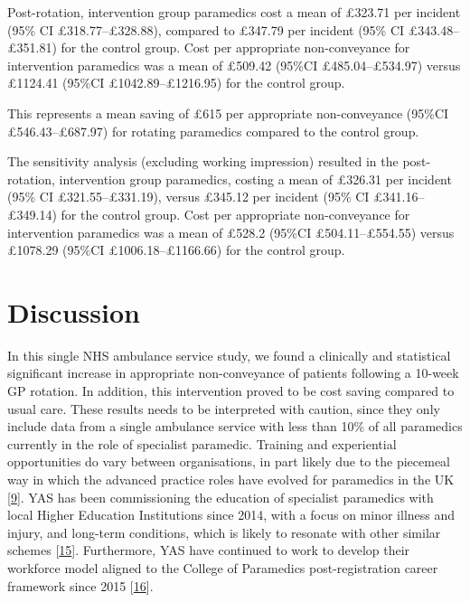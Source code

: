 \documentclass[
  a4paper,
  openany]{article}
\begin{document}
Post-rotation, intervention group paramedics cost a mean of £323.71 per incident (95\% CI £318.77--£328.88), compared to £347.79 per incident (95\% CI £343.48--£351.81) for the control group. Cost per appropriate non-conveyance for intervention paramedics was a mean of £509.42 (95\%CI £485.04--£534.97) versus £1124.41 (95\%CI £1042.89--£1216.95) for the control group.

This represents a mean saving of £615 per appropriate non-conveyance (95\%CI £546.43--£687.97) for rotating paramedics compared to the control group.

The sensitivity analysis (excluding working impression) resulted in the post-rotation, intervention group paramedics, costing a mean of £326.31 per incident (95\% CI £321.55--£331.19), versus £345.12 per incident (95\% CI £341.16--£349.14) for the control group. Cost per appropriate non-conveyance for intervention paramedics was a mean of £528.2 (95\%CI £504.11--£554.55) versus £1078.29 (95\%CI £1006.18--£1166.66) for the control group.

\hypertarget{discussion}{%
\section*{Discussion}\label{discussion}}

In this single NHS ambulance service study, we found a clinically and statistical significant increase in appropriate non-conveyance of patients following a 10-week GP rotation. In addition, this intervention proved to be cost saving compared to usual care. These results needs to be interpreted with caution, since they only include data from a single ambulance service with less than 10\% of all paramedics currently in the role of specialist paramedic. Training and experiential opportunities do vary between organisations, in part likely due to the piecemeal way in which the advanced practice roles have evolved for paramedics in the UK {[}\protect\hyperlink{ref-turner_evaluation_2018}{9}{]}. YAS has been commissioning the education of specialist paramedics with local Higher Education Institutions since 2014, with a focus on minor illness and injury, and long-term conditions, which is likely to resonate with other similar schemes {[}\protect\hyperlink{ref-hodge_maintaining_2018}{15}{]}. Furthermore, YAS have continued to work to develop their workforce model aligned to the College of Paramedics post-registration career framework since 2015 {[}\protect\hyperlink{ref-college_of_paramedics_post-registration_2018}{16}{]}.
\end{document}
